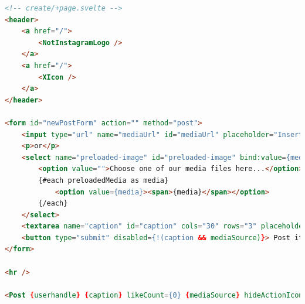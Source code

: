 \documentclass[a4paper, 10pt]{article}
\makeatletter
\renewcommand\listoffigures{%
  \section{\listfigurename}%
  \@mkboth{\MakeUppercase\listfigurename}{\MakeUppercase\listfigurename}%
  \@starttoc{lof}%
}
\renewcommand\listoftables{%
  \section{\listtablename}%
  \@mkboth{\MakeUppercase\listtablename}{\MakeUppercase\listtablename}%
  \@starttoc{lot}%
}
\makeatother
\begin{document}
\begin{lstlisting}[caption=Create in Svelte (Template), label={lst:Svelte:Create:Template}, language=HTML, firstnumber=20]
<!-- create/+page.svelte -->
<header>
	<a href="/">
		<NotInstagramLogo />
	</a>
	<a href="/">
		<XIcon />
	</a>
</header>

<form id="newPostForm" action="" method="post">
	<input type="url" name="mediaUrl" id="mediaUrl" placeholder="Insert your media URL here..." bind:value={mediaUrl}/>
	<p>or</p>
	<select name="preloaded-image" id="preloaded-image" bind:value={mediaChoice}>
		<option value="">Choose one of our media files here...</option>
		{#each preloadedMedia as media}
			<option value={media}><span>{media}</span></option>
		{/each}
	</select>
	<textarea name="caption" id="caption" cols="30" rows="3" placeholder="Type your caption here" bind:value={caption} />
	<button type="submit" disabled={!(caption && mediaSource)}> Post it! </button>
</form>

<hr />

<Post {userhandle} {caption} likeCount={0} {mediaSource} hideActionIcons={true} />
\end{lstlisting}


\pagebreak

\listoffigures

\listoftables
\end{document}
